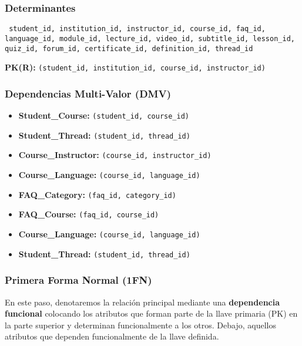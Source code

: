 \documentclass[../main.tex]{subfiles}
\begin{document}
\subsubsection{Determinantes}

\begin{flushleft}
  \texttt{%
    student\_id, institution\_id, instructor\_id, course\_id,
    faq\_id, language\_id, module\_id, lecture\_id, video\_id,
    subtitle\_id, lesson\_id, quiz\_id, forum\_id, certificate\_id,
    definition\_id, thread\_id
  }

  \textbf{PK(R):} \texttt{(student\_id, institution\_id, course\_id, instructor\_id)}
\end{flushleft}

\subsubsection{Dependencias Multi-Valor (DMV)}

\begin{itemize}
  \item \textbf{Student\_Course:} \texttt{(student\_id, course\_id)}
  \item \textbf{Student\_Thread:} \texttt{(student\_id, thread\_id)}
  \item \textbf{Course\_Instructor:} \texttt{(course\_id, instructor\_id)}
  \item \textbf{Course\_Language:} \texttt{(course\_id, language\_id)}
  \item \textbf{FAQ\_Category:} \texttt{(faq\_id, category\_id)}
  \item \textbf{FAQ\_Course:} \texttt{(faq\_id, course\_id)}
  \item \textbf{Course\_Language:} \texttt{(course\_id, language\_id)}
  \item \textbf{Student\_Thread:} \texttt{(student\_id, thread\_id)}
\end{itemize}

\subsubsection{Primera Forma Normal (1FN)}

En este paso, denotaremos la relación principal mediante una \textbf{dependencia
funcional} colocando los atributos que forman parte de la llave primaria (PK)
en la parte superior y determinan funcionalmente a los otros. Debajo,
aquellos atributos que dependen funcionalmente de la llave definida.
\end{document}
